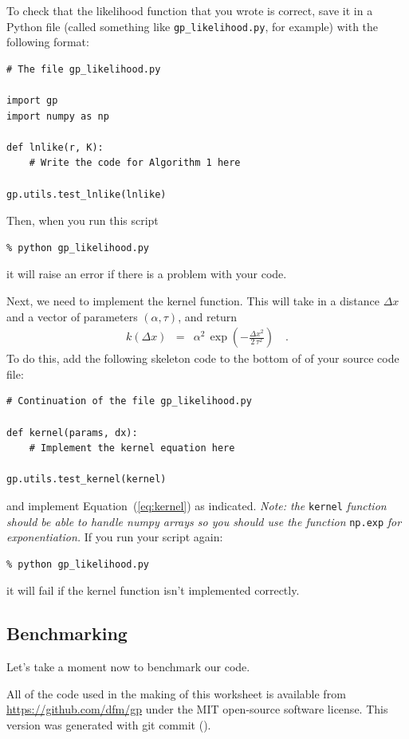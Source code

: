 \documentclass[12pt,preprint]{aastex}
\newcommand{\project}[1]{{\sffamily #1}}
\newcommand{\Eq}[1]{Equation~(\ref{eq:#1})}
\newcommand{\eq}[1]{\Eq{#1}}
\newcommand{\eqlabel}[1]{\label{eq:#1}}
\begin{document}
To check that the likelihood function that you wrote is correct, save it in a
Python file (called something like \texttt{gp\_likelihood.py}, for example)
with the following format:
\begin{lstlisting}[frame=single]
# The file gp_likelihood.py

import gp
import numpy as np

def lnlike(r, K):
    # Write the code for Algorithm 1 here

gp.utils.test_lnlike(lnlike)
\end{lstlisting}
Then, when you run this script
\begin{lstlisting}
% python gp_likelihood.py
\end{lstlisting}
it will raise an error if there is a problem with your code.

Next, we need to implement the kernel function.
This will take in a distance $\Delta x$ and a vector of parameters
$(\alpha, \tau)$, and return
\begin{eqnarray}\eqlabel{kernel}
k(\Delta x) &=& \alpha^2\,\exp \left(-\frac{\Delta x^2}{2\,\tau^2}\right) \quad.
\end{eqnarray}
To do this, add the following skeleton code to the bottom of of your source
code file:
\begin{lstlisting}[frame=single]
# Continuation of the file gp_likelihood.py

def kernel(params, dx):
    # Implement the kernel equation here

gp.utils.test_kernel(kernel)
\end{lstlisting}
and implement \eq{kernel} as indicated.
\emph{Note: the} \texttt{kernel} \emph{function should be able to handle
\project{numpy} arrays so you should use the function} \texttt{np.exp}
\emph{for exponentiation.}
If you run your script again:
\begin{lstlisting}
% python gp_likelihood.py
\end{lstlisting}
it will fail if the kernel function isn't implemented correctly.

\subsection{Benchmarking}

Let's take a moment now to benchmark our code.







All of the code used in the making of this worksheet is available from
\url{https://github.com/dfm/gp} under the MIT open-source software license.
This version was generated with git commit \texttt{\githash} (\gitdate).
\end{document}
